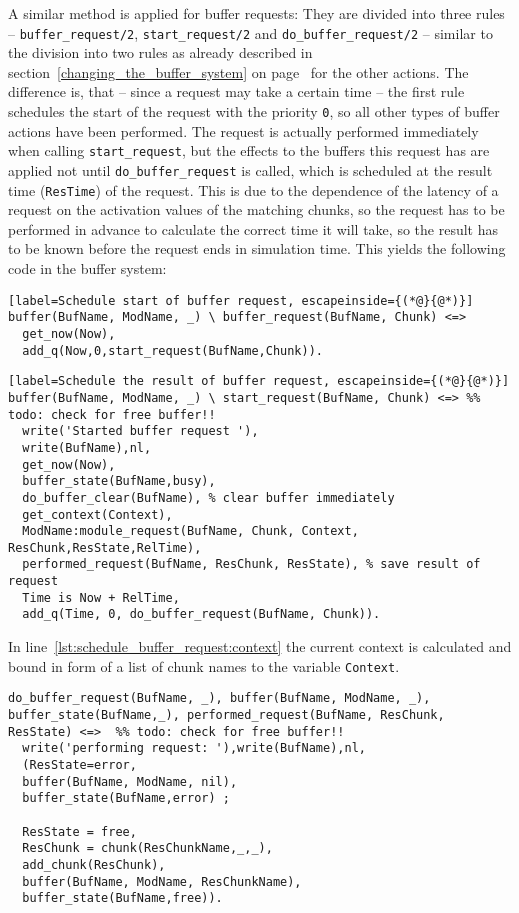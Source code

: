 A similar method is applied for buffer requests: They are divided into three rules -- \lstinline|buffer_request/2|, \lstinline|start_request/2| and \lstinline|do_buffer_request/2| -- similar to the division into two rules as already described in section~\ref{changing_the_buffer_system} on page~\pageref{changing_the_buffer_system} for the other actions. The difference is, that -- since a request may take a certain time -- the first rule schedules the start of the request with the priority \lstinline|0|, so all other types of buffer actions have been performed. The request is actually performed immediately when calling \lstinline|start_request|, but the effects to the buffers this request has are applied not until \lstinline|do_buffer_request| is called, which is scheduled at the result time (\lstinline|ResTime|) of the request. This is due to the dependence of the latency of a request on the activation values of the matching chunks, so the request has to be performed in advance to calculate the correct time it will take, so the result has to be known before the request ends in simulation time. This yields the following code in the buffer system:

\begin{lstlisting}[label=Schedule start of buffer request, escapeinside={(*@}{@*)}]
buffer(BufName, ModName, _) \ buffer_request(BufName, Chunk) <=>
  get_now(Now),
  add_q(Now,0,start_request(BufName,Chunk)).
\end{lstlisting}

\begin{lstlisting}[label=Schedule the result of buffer request, escapeinside={(*@}{@*)}]
buffer(BufName, ModName, _) \ start_request(BufName, Chunk) <=> %% todo: check for free buffer!!
  write('Started buffer request '),
  write(BufName),nl,
  get_now(Now),
  buffer_state(BufName,busy),
  do_buffer_clear(BufName), % clear buffer immediately
  get_context(Context),
  ModName:module_request(BufName, Chunk, Context, ResChunk,ResState,RelTime),
  performed_request(BufName, ResChunk, ResState), % save result of request
  Time is Now + RelTime, 
  add_q(Time, 0, do_buffer_request(BufName, Chunk)).
\end{lstlisting}

In line~\ref{lst:schedule_buffer_request:context} the current context is calculated and bound in form of a list of chunk names to the variable \lstinline|Context|.
  
\begin{lstlisting}[label=Handle buffer request]
do_buffer_request(BufName, _), buffer(BufName, ModName, _), buffer_state(BufName,_), performed_request(BufName, ResChunk, ResState) <=>  %% todo: check for free buffer!!
  write('performing request: '),write(BufName),nl,
  (ResState=error, 
  buffer(BufName, ModName, nil),
  buffer_state(BufName,error) ;  
  
  ResState = free,
  ResChunk = chunk(ResChunkName,_,_),
  add_chunk(ResChunk), 
  buffer(BufName, ModName, ResChunkName),
  buffer_state(BufName,free)).  
\end{lstlisting}

